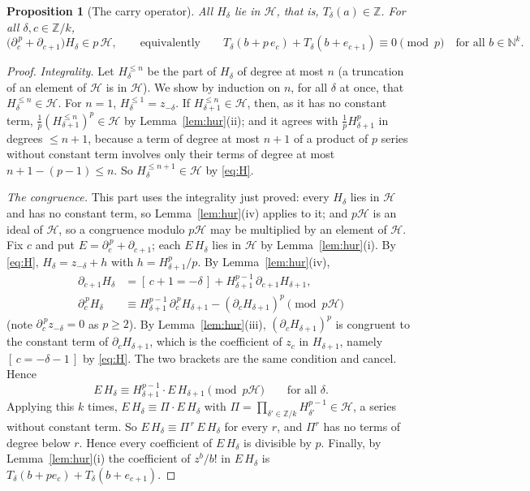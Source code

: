 \documentclass[11pt]{article}
\newtheorem{proposition}[theorem]{Proposition}
\theoremstyle{definition}
\theoremstyle{remark}
\newcommand{\Z}{\mathbb Z}
\newcommand{\N}{\mathbb N}
\newcommand{\Hur}{\mathcal H}
\newcommand{\br}[1]{[\,#1\,]}
\begin{document}
\begin{proposition}[The carry operator]\label{prop:carry}
All $H_\delta$ lie in $\Hur$, that is, $T_\delta(a)\in\Z$. For all $\delta,c\in\Z/k$,
\[
 \bigl(\partial_c^{\,p}+\partial_{c+1}\bigr)H_\delta\in p\,\Hur ,
 \qquad\text{equivalently}\qquad
 T_\delta(b+p\,e_c)+T_\delta(b+e_{c+1})\equiv0\pmod p\quad\text{for all }b\in\N^k .
\]
\end{proposition}

\begin{proof}
\emph{Integrality.} Let $H_\delta^{\le n}$ be the part of $H_\delta$ of degree at most $n$
(a truncation of an element of $\Hur$ is in $\Hur$). We show by induction on $n$, for all
$\delta$ at once, that $H_\delta^{\le n}\in\Hur$. For $n=1$, $H_\delta^{\le1}=z_{-\delta}$.
If $H_{\delta+1}^{\le n}\in\Hur$, then, as it has no constant term,
$\frac1p(H_{\delta+1}^{\le n})^p\in\Hur$ by Lemma~\ref{lem:hur}(ii); and it agrees with
$\frac1pH_{\delta+1}^p$ in degrees $\le n+1$, because a term of degree at most $n+1$ of a
product of $p$ series without constant term involves only their terms of degree at most
$n+1-(p-1)\le n$. So $H_\delta^{\le n+1}\in\Hur$ by \eqref{eq:H}.

\emph{The congruence.} This part uses the integrality just proved: every $H_\delta$ lies in
$\Hur$ and has no constant term, so Lemma~\ref{lem:hur}(iv) applies to it; and $p\Hur$ is an
ideal of $\Hur$, so a congruence modulo $p\Hur$ may be multiplied by an element of $\Hur$.
Fix $c$ and put $E=\partial_c^{\,p}+\partial_{c+1}$; each $E\,H_\delta$ lies in $\Hur$ by
Lemma~\ref{lem:hur}(i). By \eqref{eq:H},
$H_\delta=z_{-\delta}+h$ with $h=H_{\delta+1}^p/p$. By Lemma~\ref{lem:hur}(iv),
\begin{align*}
 \partial_{c+1}H_\delta&=\br{c+1=-\delta}+H_{\delta+1}^{p-1}\,\partial_{c+1}H_{\delta+1},\\
 \partial_c^{\,p}H_\delta&\equiv H_{\delta+1}^{p-1}\,\partial_c^{\,p}H_{\delta+1}
   -(\partial_cH_{\delta+1})^p\pmod{p\Hur}
\end{align*}
(note $\partial_c^{\,p}z_{-\delta}=0$ as $p\ge2$). By Lemma~\ref{lem:hur}(iii),
$(\partial_cH_{\delta+1})^p$ is congruent to the constant term of $\partial_cH_{\delta+1}$,
which is the coefficient of $z_c$ in $H_{\delta+1}$, namely $\br{c=-\delta-1}$ by
\eqref{eq:H}. The two brackets are the same condition and cancel. Hence
\[
 E\,H_\delta\equiv H_{\delta+1}^{p-1}\cdot E\,H_{\delta+1}\pmod{p\Hur}\qquad
 \text{for all }\delta .
\]
Applying this $k$ times, $E\,H_\delta\equiv\Pi\cdot E\,H_\delta$ with
$\Pi=\prod_{\delta'\in\Z/k}H_{\delta'}^{p-1}\in\Hur$, a series without constant term. So
$E\,H_\delta\equiv\Pi^{\,r}\,E\,H_\delta$ for every $r$, and $\Pi^r$ has no terms of degree
below $r$. Hence every coefficient of $E\,H_\delta$ is divisible by $p$. Finally, by
Lemma~\ref{lem:hur}(i) the coefficient of $z^b/b!$ in $E\,H_\delta$ is
$T_\delta(b+pe_c)+T_\delta(b+e_{c+1})$.
\end{proof}
\end{document}
